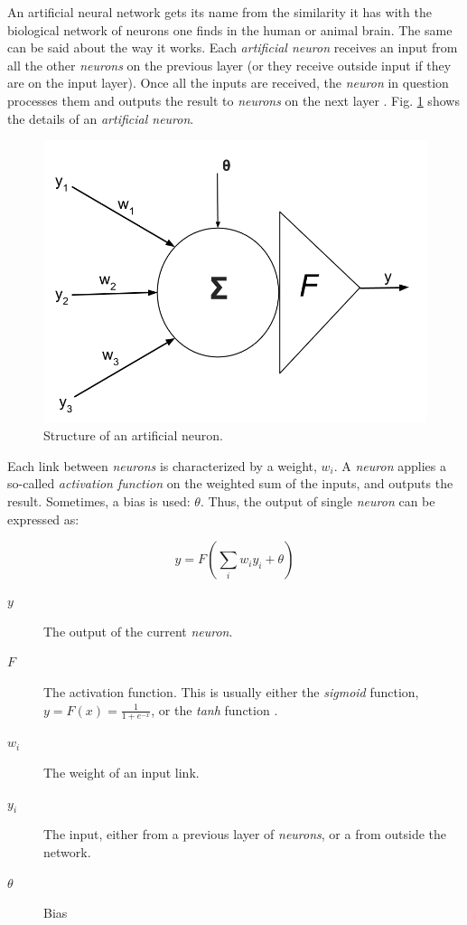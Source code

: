 An artificial neural network gets its name from the similarity it has with the biological network of neurons one finds in the human or animal brain. The same can be said about the way it works. Each \textit{artificial neuron} receives an input from all the other \textit{neurons} on the previous layer (or they receive outside input if they are on the input layer). Once all the inputs are received, the \textit{neuron} in question processes them and outputs the result to \textit{neurons} on the next layer \cite{annintroduction}. Fig. \ref{pic:neuron} shows the details of an \textit{artificial neuron}.

\begin{figure}[h]
	\begin{center}
		\includegraphics[scale=0.3]{figures/neuron.png}
	\end{center}
	
	\caption{Structure of an artificial neuron.}
	\label{pic:neuron}

\end{figure}

Each link between \textit{neurons} is characterized by a weight, $w_i$. A \textit{neuron} applies a so-called \textit{activation function} on the weighted sum of the inputs, and outputs the result. Sometimes, a bias is used: $\theta$. Thus, the output of single \textit{neuron} can be expressed as:

\begin{equation*}
y = F(\sum_i w_i y_i + \theta)
\end{equation*}

\begin{description}
  \item[$y$]   The output of the current \textit{neuron}.
  \item[$F$]   The activation function. This is usually either the \textit{sigmoid} function, $y = F(x) = \frac{1}{1 + e^{-x}}$, or the \textit{tanh} function \cite{annintroduction}.
  \item[$w_i$] The weight of an input link.
  \item[$y_i$] The input, either from a previous layer of \textit{neurons}, or a from outside the network.
  \item[$\theta$] Bias
\end{description}

